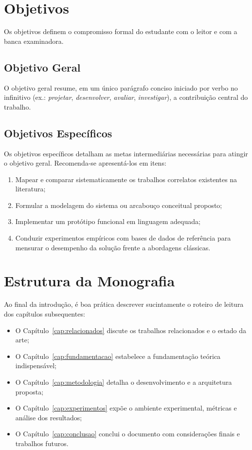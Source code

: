 \documentclass[cic,tc,biblatex]{iiufrgs}
\begin{document}
\section{Objetivos}
\label{sec:objetivos}

Os objetivos definem o compromisso formal do estudante com o leitor e com a banca examinadora.

\subsection{Objetivo Geral}
O objetivo geral resume, em um único parágrafo conciso iniciado por verbo no infinitivo (ex.: \emph{projetar}, \emph{desenvolver}, \emph{avaliar}, \emph{investigar}), a contribuição central do trabalho.

\subsection{Objetivos Específicos}
Os objetivos específicos detalham as metas intermediárias necessárias para atingir o objetivo geral. Recomenda-se apresentá-los em itens:
\begin{enumerate}
    \item Mapear e comparar sistematicamente os trabalhos correlatos existentes na literatura;
    \item Formular a modelagem do sistema ou arcabouço conceitual proposto;
    \item Implementar um protótipo funcional em linguagem adequada;
    \item Conduzir experimentos empíricos com bases de dados de referência para mensurar o desempenho da solução frente a abordagens clássicas.
\end{enumerate}

\section{Estrutura da Monografia}
\label{sec:estrutura_mono}

Ao final da introdução, é boa prática descrever sucintamente o roteiro de leitura dos capítulos subsequentes:
\begin{itemize}
    \item O Capítulo~\ref{cap:relacionados} discute os trabalhos relacionados e o estado da arte;
    \item O Capítulo~\ref{cap:fundamentacao} estabelece a fundamentação teórica indispensável;
    \item O Capítulo~\ref{cap:metodologia} detalha o desenvolvimento e a arquitetura proposta;
    \item O Capítulo~\ref{cap:experimentos} expõe o ambiente experimental, métricas e análise dos resultados;
    \item O Capítulo~\ref{cap:conclusao} conclui o documento com considerações finais e trabalhos futuros.
\end{itemize}
\end{document}
